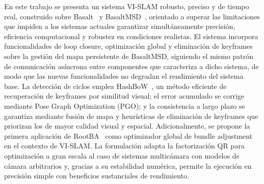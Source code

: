 En este trabajo se presenta un sistema VI-SLAM robusto, preciso y de tiempo real, construido sobre Basalt~\cite{usenko2020basalt} y BasaltMSD~\cite{demayo2025monadoslamdataset, zanotti2024basaltxr}, orientado a superar las limitaciones que impiden a los sistemas actuales garantizar simultáneamente precisión, eficiencia computacional y robustez en condiciones realistas. El sistema incorpora funcionalidades de loop closure, optimización global y eliminación de keyframes sobre la gestión del mapa persistente de BasaltMSD, siguiendo el mismo patrón de comunicación asíncrona entre componentes que caracteriza a dicho sistema, de modo que las nuevas funcionalidades no degradan el rendimiento del sistema base. La detección de ciclos emplea HashBoW~\cite{stricker2024hashbow}, un método eficiente de recuperación de keyframes por similitud visual; el error acumulado se corrige mediante Pose Graph Optimization (PGO); y la consistencia a largo plazo se garantiza mediante fusión de mapa y heurísticas de eliminación de keyframes que priorizan los de mayor calidad visual y espacial. Adicionalmente, se propone la primera aplicación de RootBA~\cite{demmel2021largescalerootba} como optimizador global de bundle adjustment en el contexto de VI-SLAM. La formulación adapta la factorización QR para optimización a gran escala al caso de sistemas multicámara con modelos de cámara arbitrarios y, gracias a su estabilidad numérica, permite la ejecución en precisión simple con beneficios sustanciales de rendimiento.


